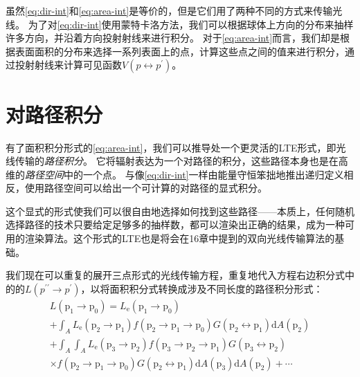 \documentclass[a4paper]{article}
\begin{document}
	虽然\eqref{eq:dir-int}和\eqref{eq:area-int}是等价的，但是它们用了两种不同的方式来传输光线。
	为了对\eqref{eq:dir-int}使用蒙特卡洛方法，我们可以根据球体上方向的分布来抽样许多方向，并沿着方向投射射线来进行积分。
	对于\eqref{eq:area-int}而言，我们却是根据表面面积的分布来选择一系列表面上的点，计算这些点之间的值来进行积分，通过投射射线来计算可见函数$V(p\leftrightarrow p^\prime)$。

	\section{对路径积分}
	有了面积积分形式的\eqref{eq:area-int}，我们可以推导处一个更灵活的LTE形式，即光线传输的\textit{路径积分}。
	它将辐射表达为一个对路径的积分，这些路径本身也是在高维的\textit{路径空间}中的一个点。
	与像\eqref{eq:dir-int}一样由能量守恒笨拙地推出递归定义相反，使用路径空间可以给出一个可计算的对路径的显式积分。

	这个显式的形式使我们可以很自由地选择如何找到这些路径——本质上，任何随机选择路径的技术只要给定足够多的抽样数，都可以渲染出正确的结果，成为一种可用的渲染算法。这个形式的LTE也是将会在16章中提到的双向光线传输算法的基础。

	我们现在可以重复的展开三点形式的光线传输方程，重复地代入方程右边积分式中的的$L(p^{\prime\prime}\rightarrow p^\prime)$，以将面积积分式转换成涉及不同长度的路径积分形式：
	\begin{multline*}
		L\left(\mathrm{p}_{1} \rightarrow \mathrm{p}_{0}\right)= L_{\mathrm{e}}\left(\mathrm{p}_{1} \rightarrow \mathrm{p}_{0}\right)\\
		+\int_{A} L_{\mathrm{e}}\left(\mathrm{p}_{2} \rightarrow \mathrm{p}_{1}\right) f\left(\mathrm{p}_{2} \rightarrow \mathrm{p}_{1} \rightarrow \mathrm{p}_{0}\right) G\left(\mathrm{p}_{2} \leftrightarrow \mathrm{p}_{1}\right) \mathrm{d} A\left(\mathrm{p}_{2}\right) \\
		+\int_{A} \int_{A} L_{\mathrm{e}}\left(\mathrm{p}_{3} \rightarrow \mathrm{p}_{2}\right) f\left(\mathrm{p}_{3} \rightarrow \mathrm{p}_{2} \rightarrow \mathrm{p}_{1}\right) G\left(\mathrm{p}_{3} \leftrightarrow \mathrm{p}_{2}\right) \\
		\times f\left(\mathrm{p}_{2} \rightarrow \mathrm{p}_{1} \rightarrow \mathrm{p}_{0}\right) G\left(\mathrm{p}_{2} \leftrightarrow \mathrm{p}_{1}\right) \mathrm{d} A\left(\mathrm{p}_{3}\right) \mathrm{d} A\left(\mathrm{p}_{2}\right)+\cdots
	\end{multline*}
\end{document}
